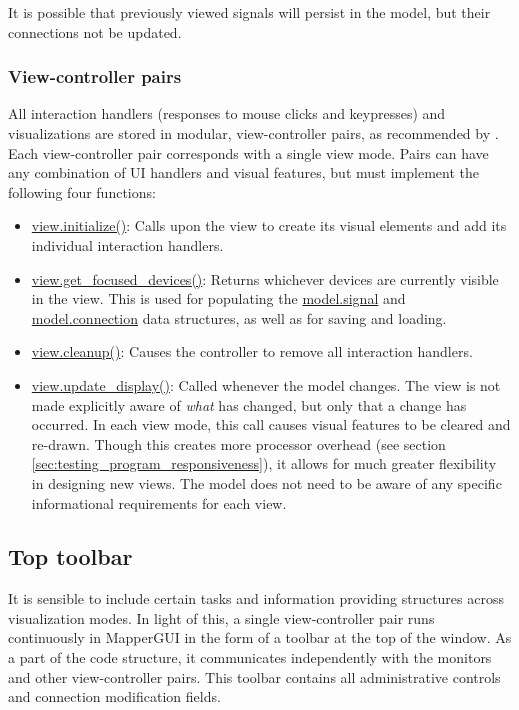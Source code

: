 It is possible that previously viewed signals will persist in the model, but their connections not be updated.

		\subsubsection{View-controller pairs}

All interaction handlers (responses to mouse clicks and keypresses) and visualizations are stored in modular, view-controller pairs, as recommended by . Each view-controller pair corresponds with a single view mode. Pairs can have any combination of UI handlers and visual features, but must implement the following four functions:

\begin{itemize}
	\item \url{view.initialize()}: Calls upon the view to create its visual elements and add its individual interaction handlers.
	\item \url{view.get_focused_devices()}: Returns whichever devices are currently visible in the view. This is used for populating the \url{model.signal} and \url{model.connection} data structures, as well as for saving and loading.
	\item \url{view.cleanup()}: Causes the controller to remove all interaction handlers.
	\item \url{view.update_display()}: Called whenever the model changes. The view is not made explicitly aware of \emph{what} has changed, but only that a change has occurred. In each view mode, this call causes visual features to be cleared and re-drawn. Though this creates more processor overhead (see section \ref{sec:testing_program_responsiveness}), it allows for much greater flexibility in designing new views. The model does not need to be aware of any specific informational requirements for each view.
\end{itemize}


	\subsection{Top toolbar} %
	\label{sec:top_toolbar}

It is sensible to include certain tasks and information providing structures across visualization modes. In light of this, a single view-controller pair runs continuously in MapperGUI in the form of a toolbar at the top of the window. As a part of the code structure, it communicates independently with the monitors and other view-controller pairs. This toolbar contains all administrative controls and connection modification fields. 

